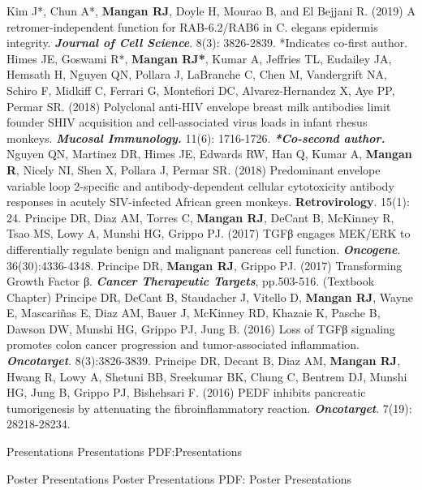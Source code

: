 \documentclass[letterpaper,MMMyyyy,nonstopmode]{simpleresumecv}
\begin{document}
\begin{Body}
\Gap
Kim J*, Chun A*, \textbf{Mangan RJ}, Doyle H, Mourao B, and El Bejjani R. (2019) A retromer-independent function for RAB-6.2/RAB6 in C. elegans epidermis integrity. \textbf{\textit{Journal of Cell Science}}. 8(3): 3826-2839. *Indicates co-first author.
\Gap
Himes JE, Goswami R*, \textbf{Mangan RJ*}, Kumar A, Jeffries TL, Eudailey JA, Hemsath H, Nguyen QN, Pollara J, LaBranche C, Chen M, Vandergrift NA, Schiro F, Midkiff C, Ferrari G, Montefiori DC, Alvarez-Hernandez X, Aye PP, Permar SR. (2018) Polyclonal anti-HIV envelope breast milk antibodies limit founder SHIV acquisition and cell-associated virus loads in infant rhesus monkeys. \textit{\textbf{Mucosal Immunology.}} 11(6): 1716-1726. \textit{\textbf{*Co-second author.}}
\Gap
Nguyen QN, Martinez DR, Himes JE, Edwards RW, Han Q, Kumar A, \textbf{Mangan R}, Nicely NI, Shen X, Pollara J, Permar SR. (2018) Predominant envelope variable loop 2-specific and antibody-dependent cellular cytotoxicity antibody responses in acutely SIV-infected African green monkeys. \textbf{Retrovirology}. 15(1): 24. 
\Gap
Principe DR, Diaz AM, Torres C, \textbf{Mangan RJ}, DeCant B, McKinney R, Tsao MS, Lowy A, Munshi HG, Grippo PJ. (2017) TGFβ engages MEK/ERK to differentially regulate benign and malignant pancreas cell function. \textbf{\textit{Oncogene}}. 36(30):4336-4348.
\Gap
Principe DR, \textbf{Mangan RJ}, Grippo PJ. (2017) Transforming Growth Factor β. \textit{\textbf{Cancer Therapeutic Targets}}, pp.503-516. (Textbook Chapter)
\Gap
Principe DR, DeCant B, Staudacher J, Vitello D, \textbf{Mangan RJ}, Wayne E, Mascariñas E, Diaz AM, Bauer J, McKinney RD, Khazaie K, Pasche B, Dawson DW, Munshi HG, Grippo PJ, Jung B. (2016) Loss of TGFβ signaling promotes colon cancer progression and tumor-associated inflammation. \textbf{\textit{Oncotarget}}. 8(3):3826-3839. 
\Gap
Principe DR, Decant B, Diaz AM, \textbf{Mangan RJ}, Hwang R, Lowy A, Shetuni BB, Sreekumar BK, Chung C, Bentrem DJ, Munshi HG, Jung B, Grippo PJ, Bishehsari F. (2016) PEDF inhibits pancreatic tumorigenesis by attenuating the fibroinflammatory reaction. \textbf{\textit{Oncotarget}}. 7(19): 28218-28234.


\href{http://www.example.com/my-paper-doi-4}


\endgroup


\Section
{Presentations}
{Presentations}
{PDF:Presentations}

\SubSection
{Poster Presentations}
{Poster Presentations}
{PDF: Poster Presentations}


\end{Body}
\end{document}

